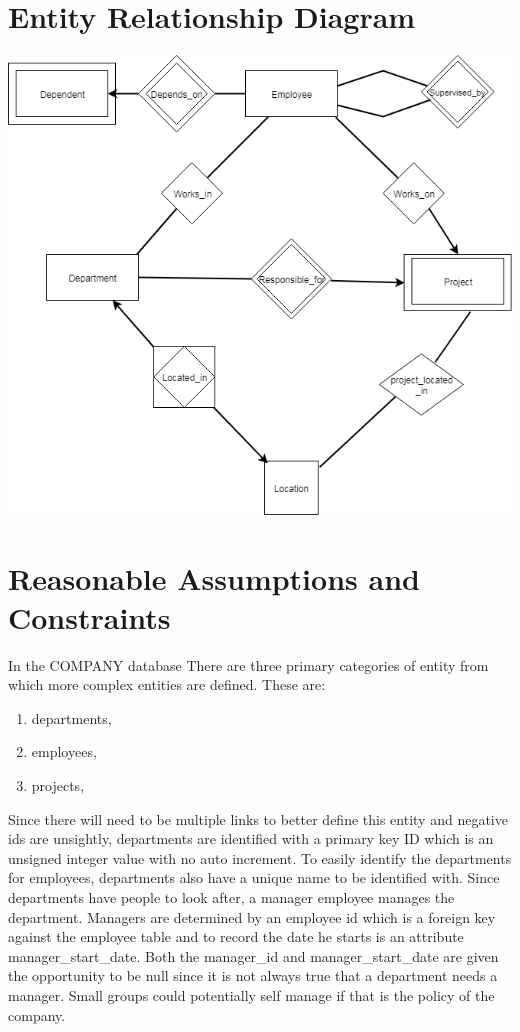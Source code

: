 \documentclass[11pt,letterpaper]{article}
\begin{document}
	\section{Entity Relationship Diagram}
\includegraphics[width=\graphicwidth]{erd.png}
	\section{Reasonable Assumptions and Constraints}
	
In the COMPANY database There are three primary categories of entity from which more complex entities are defined. These are:
\begin{enumerate}[]
	\item departments, 
	\item employees,
	\item projects,
\end{enumerate}

Since there will need to be multiple links to better define this entity and negative ids are unsightly, departments are identified with a primary key ID which is an unsigned integer value with no auto increment. To easily identify the departments for employees, departments also have a unique name to be identified with. Since departments have people to look after, a manager employee manages the department. Managers are determined by an employee id which is a foreign key against the employee table and to record the date he starts is an attribute manager\_start\_date.
Both the manager\_id and manager\_start\_date are given the opportunity to be null since it is not always true that a department needs a manager. Small groups could potentially self manage if that is the policy of the company.\\
\end{document}
